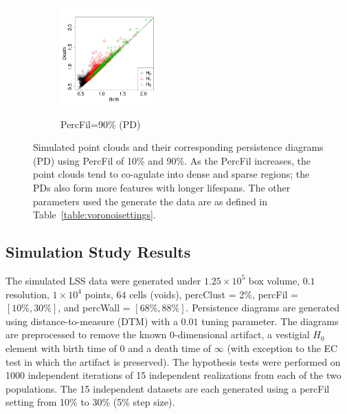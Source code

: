 \documentclass[12pt]{article}
\begin{document}
\begin{center}
\begin{figure}[htp!]
\begin{subfigure}{.24\textwidth}
      \label{fig:percfil09voronoi}
    \end{subfigure}
    \begin{subfigure}{.24\textwidth}
      \centering
      \caption{PercFil=90\% (PD)}
      \includegraphics[height=1.5in]{figure_7_pd_0_9.pdf}
      \label{fig:percfil09pd}
    \end{subfigure}
      \caption{Simulated point clouds and their corresponding persistence diagrams (PD) using PercFil of 10\% and 90\%. As the PercFil increases, the point clouds tend to co-agulate into dense and sparse regions; the PDs also form more features with longer lifespans. The other parameters used the generate the data are as defined in Table~\ref{table:voronoisettings}.}
      \label{fig:percfilexample}
  \end{figure}
\end{center}

\subsection{Simulation Study Results}
\label{sec:results1}
The simulated LSS data were generated under $1.25 \times  10^{5}$ box volume, $0.1$ resolution, $1 \times  10^{4}$ points, $64$ cells (voids), percClust = 2\%,  percFil = $[10\%, 30\%]$, and percWall = $[68\%, 88\%]$. 
Persistence diagrams are generated using distance-to-measure (DTM) with a $0.01$ tuning parameter. The diagrams are preprocessed to remove the known 0-dimensional artifact, a vestigial $H_{0}$ element with birth time of 0 and a death time of $\infty$ (with exception to the EC test in which the artifact is preserved). The hypothesis tests were performed on 1000 independent iterations of 15 independent realizations from each of the two populations. The 15 independent datasets are each generated using a percFil setting from 10\% to 30\% (5\% step size).   
\end{document}
